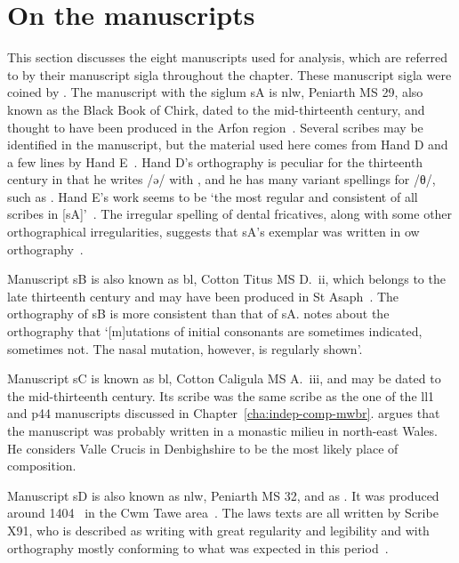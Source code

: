 \section{On the manuscripts}
\label{sec:manuscripts}
This section discusses the eight manuscripts used for analysis, which are referred to by their manuscript sigla throughout the chapter. These manuscript sigla were coined by \textcite{owen_ancient_1841}.
The manuscript with the siglum \gls{sA} is  \gls{nlw}, Peniarth MS 29, also known as the Black Book of Chirk, dated to the mid-thirteenth century, and thought to have been produced in the Arfon region~\autocite[171]{Rus_Scribal95}.
Several scribes may be identified in the manuscript, but the material used here comes from Hand D and a few lines by Hand E~\autocite[133--134]{Rus_Scribal95}.
Hand D's orthography is peculiar for the thirteenth century in that he writes /ə/ with , and he has many variant spellings for /θ/, such as .
Hand E's work seems to be `the most regular and consistent of all scribes in [\gls{sA}]'~\autocite[152]{Rus_Scribal95}.
The irregular spelling of dental fricatives, along with some other orthographical irregularities, suggests that \gls{sA}'s exemplar was written in \gls{ow} orthography~\autocite[169]{Rus_Scribal95}. 

Manuscript \gls{sB} is also known as \acrshort{bl}, Cotton Titus MS D.~ii, which belongs to the late thirteenth century and may have been produced in St Asaph~\autocite[v]{elias_golygiad_2007}. The orthography of \gls{sB} is more consistent than that of \gls{sA}. \Textcite[xlii]{wiliam_llyfr_1960} notes about the orthography that `[m]utations of initial consonants are sometimes indicated, sometimes not. The nasal mutation, however, is regularly shown'.

Manuscript \gls{sC} is known  as \gls{bl}, Cotton Caligula MS A.~iii, and may be dated to the mid-thirteenth century. Its scribe was the same scribe as the one of the \gls{ll1} and \gls{p44} manuscripts discussed in Chapter~\ref{cha:indep-comp-mwbr}. \Textcite[189]{huws_medieval_2000} argues that the manuscript was probably written in a monastic milieu in north-east Wales. He considers Valle Crucis in Denbighshire to be the most likely place of composition.

Manuscript \gls{sD} is also known as \gls{nlw}, Peniarth MS 32, and as . It was produced around 1404~\autocite[60]{huws_medieval_2000} in the Cwm Tawe area~\autocite[v]{elias_golygiad_2007}. The laws texts are all written by Scribe X91, who is described as writing with great regularity and legibility and with orthography mostly conforming to what was expected in this period~\autocite{thomas_tei_2013}.

